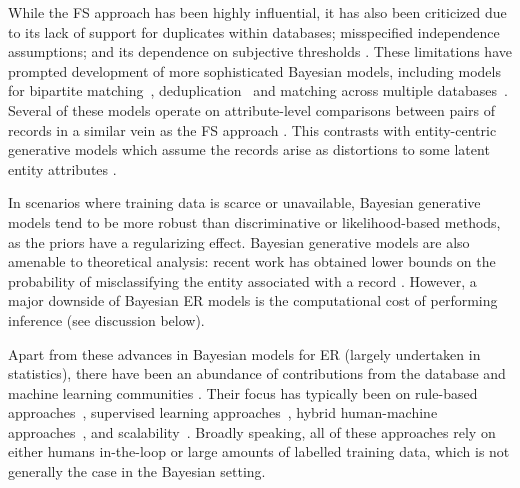 \documentclass[12pt,letterpaper]{article}
\newcommand{\1}[1]{\mathbb{I}\!\left[#1\right]} %
\begin{document}
While the FS approach has been highly influential, it has also been 
criticized due to its lack of support for duplicates within databases; 
misspecified independence assumptions; and its dependence on subjective 
thresholds \citep{tancredi_hierarchical_2011}.
These limitations have prompted development of more sophisticated 
Bayesian models, including models for bipartite 
matching~\citep{fortini_bayesian_2001, larsen_advances_2005, 
  larsen_experiment_2012, tancredi_hierarchical_2011, gutman_bayesian_2013, 
  sadinle_bayesian_2017, mcveigh_scaling_2019}, 
deduplication~\citep{sadinle_detecting_2014, tancredi_unified_2020}
and matching across multiple databases~\citep{steorts_entity_2015, 
  steorts_bayesian_2016}.
Several of these models operate on attribute-level comparisons between 
pairs of records in a similar vein as the FS approach 
\citep{larsen_advances_2005, larsen_experiment_2012, gutman_bayesian_2013, 
  sadinle_detecting_2014, sadinle_bayesian_2017, mcveigh_scaling_2019}.
This contrasts with entity-centric generative models which assume the 
records arise as distortions to some latent entity attributes 
\citep{tancredi_hierarchical_2011, steorts_entity_2015, 
  steorts_bayesian_2016, tancredi_unified_2020}.

In scenarios where training data is scarce or unavailable, Bayesian 
generative models tend to be more robust than discriminative or 
likelihood-based methods, as the priors have a regularizing effect. 
Bayesian generative models are also amenable to theoretical analysis: 
recent work has obtained lower bounds on the probability of misclassifying 
the entity associated with a record \citep{steorts_performance_2017}.
However, a major downside of Bayesian ER models is the computational 
cost of performing inference (see discussion below).

Apart from these advances in Bayesian models for ER (largely undertaken 
in statistics), there have been an abundance of contributions from the 
database and machine learning communities 
\citep[see surveys by][]{getoor_entity_2012, christen_data_2012}.
Their focus has typically been on rule-based 
approaches~\citep{fan_reasoning_2009, singh_generating_2017}, 
supervised learning approaches~\citep{mudgal_deep_2018}, 
hybrid human-machine approaches~\citep{wang_crowder:_2012, 
  gokhale_corleone:_2014}, 
and scalability~\citep{papadakis_comparative_2016}.
Broadly speaking, all of these approaches rely on either humans in-the-loop 
or large amounts of labelled training data, which is not generally the 
case in the Bayesian setting.
\end{document}
